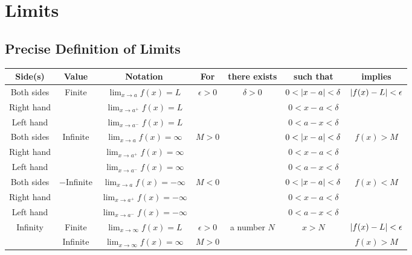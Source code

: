 \documentclass[../ma2002_notes.tex]{subfiles}
\begin{document}
\section{Limits}
\subsection{Precise Definition of Limits}
\begin{tabular}{|c|c|c|c|c|c|c|}
\hline
Side(s) & Value & Notation & For & there exists & such that & implies\\
\hline
Both sides & \multirow{3}{*}{Finite} & \(\displaystyle\lim_{x\to a}f(x)=L\) & \multirow{3}{*}{\(\epsilon>0\)} & \multirow{9}{*}{\(\delta>0\)} & \(0<\lvert x-a\rvert<\delta\) & \multirow{3}{*}{\(\lvert f(x)-L\rvert<\epsilon\)} \\
\cline{1-1}\cline{3-3}\cline{6-6}
Right hand & & \(\displaystyle\lim_{x\to a^+}f(x)=L\) & & & \(0<x-a<\delta\) & \\
\cline{1-1}\cline{3-3}\cline{6-6}
Left hand & & \(\displaystyle\lim_{x\to a^-}f(x)=L\) & & & \(0<a-x<\delta\) & \\
\cline{1-4}\cline{6-7}
Both sides & \multirow{3}{*}{Infinite} & \(\displaystyle\lim_{x\to a}f(x)=\infty\) & \multirow{3}{*}{\(M>0\)} & & \(0<\lvert x-a\rvert<\delta\) & \multirow{3}{*}{\(f(x)>M\)} \\
\cline{1-1}\cline{3-3}\cline{6-6}
Right hand & & \(\displaystyle\lim_{x\to a^+}f(x)=\infty\) & & & \(0<x-a<\delta\) & \\
\cline{1-1}\cline{3-3}\cline{6-6}
Left hand & & \(\displaystyle\lim_{x\to a^-}f(x)=\infty\) & & & \(0<a-x<\delta\) & \\
\cline{1-4}\cline{6-7}
Both sides & \multirow{3}{*}{\(-\)Infinite} & \(\displaystyle\lim_{x\to a}f(x)=-\infty\) & \multirow{3}{*}{\(M<0\)} & & \(0<\lvert x-a\rvert<\delta\) & \multirow{3}{*}{\(f(x)<M\)} \\
\cline{1-1}\cline{3-3}\cline{6-6}
Right hand & & \(\displaystyle\lim_{x\to a^+}f(x)=-\infty\) & & & \(0<x-a<\delta\) & \\
\cline{1-1}\cline{3-3}\cline{6-6}
Left hand & & \(\displaystyle\lim_{x\to a^-}f(x)=-\infty\) & & & \(0<a-x<\delta\) & \\
\hline
\multirow{3}{*}{Infinity} & Finite & \(\displaystyle\lim_{x\to \infty}f(x)=L\) & \(\epsilon>0\) & \multirow{3}{*}{a number \(N\)} & \multirow{3}{*}{\(x>N\)} & \(\lvert f(x)-L\rvert<\epsilon\) \\
\cline{2-4}\cline{7-7}
& Infinite & \(\displaystyle\lim_{x\to \infty}f(x)=\infty\) & \(M>0\) & & & \(f(x)>M\) \\

\end{tabular}
\end{document}

